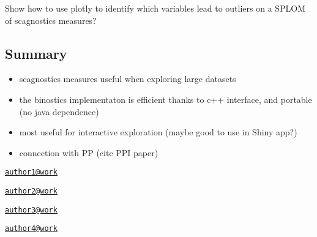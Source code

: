 Show how to use plotly to identify which variables lead to outliers on a
SPLOM of scagnostics measures?

\hypertarget{summary}{%
\subsection{Summary}\label{summary}}

\begin{itemize}
\tightlist
\item
  scagnostics measures useful when exploring large datasets
\item
  the binostics implementaton is efficient thanks to c++ interface, and
  portable (no java dependence)
\item
  most useful for interactive exploration (maybe good to use in Shiny
  app?)
\item
  connection with PP (cite PPI paper)
\end{itemize}




\address{%
Ursula Laa\\
Affiliation\\
line 1\\ line 2\\
}
\href{mailto:author1@work}{\nolinkurl{author1@work}}

\address{%
Dianne Cook\\
Affiliation\\
line 1\\ line 2\\
}
\href{mailto:author2@work}{\nolinkurl{author2@work}}

\address{%
Hadley Wickham\\
Affiliation\\
line 1\\ line 2\\
}
\href{mailto:author3@work}{\nolinkurl{author3@work}}

\address{%
Heike Hofmann\\
Affiliation\\
line 1\\ line 2\\
}
\href{mailto:author4@work}{\nolinkurl{author4@work}}

